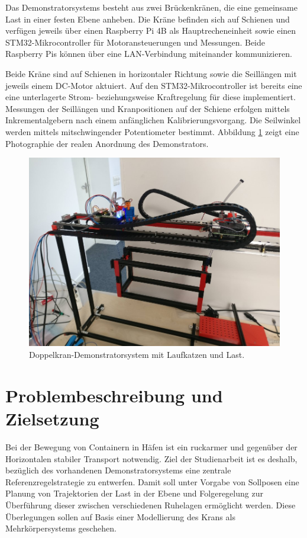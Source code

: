 Das Demonstratorsystems besteht aus zwei Brückenkränen, die eine gemeinsame Last in einer festen Ebene anheben. Die Kräne befinden sich auf Schienen und verfügen jeweils über einen Raspberry Pi 4B als Hauptrecheneinheit sowie einen STM32-Mikrocontroller für Motoransteuerungen und Messungen. Beide Raspberry Pis können über eine LAN-Verbindung miteinander kommunizieren.

Beide Kräne sind auf Schienen in horizontaler Richtung sowie die Seillängen mit jeweils einem DC-Motor aktuiert. Auf den STM32-Mikrocontroller ist bereits eine eine unterlagerte Strom- beziehungsweise Kraftregelung für diese implementiert.
Messungen der Seillängen und Kranpositionen auf der Schiene erfolgen mittels Inkrementalgebern nach einem anfänglichen Kalibrierungsvorgang. Die Seilwinkel werden mittels mitschwingender Potentiometer bestimmt. Abbildung \ref{fig:demonstrator_real} zeigt
eine Photographie der realen Anordnung des Demonstrators.

\begin{figure}[ht]
	\begin{center}
		\includegraphics[scale=1]{Pictures/real_gantry.jpg}
	\end{center}
	\caption[Doppelkran-Demonstratorsystem mit Laufkatzen und Last]
	{Doppelkran-Demonstratorsystem mit Laufkatzen und Last.}
	\label{fig:demonstrator_real}
\end{figure}

\section{Problembeschreibung und Zielsetzung}
Bei der Bewegung von Containern in Häfen ist ein ruckarmer und gegenüber der Horizontalen stabiler Transport notwendig. Ziel der Studienarbeit ist es deshalb,  bezüglich des vorhandenen Demonstratorsystems eine zentrale Referenzregelstrategie zu entwerfen. Damit soll unter Vorgabe von Sollposen eine Planung von Trajektorien der Last in der Ebene und Folgeregelung zur Überführung dieser zwischen verschiedenen Ruhelagen ermöglicht werden. Diese Überlegungen sollen auf Basis einer Modellierung des Krans als Mehrkörpersystems geschehen. 

